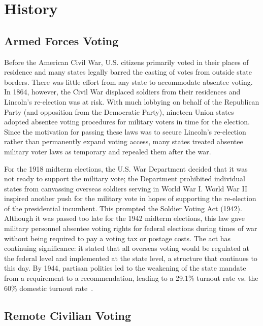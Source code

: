 \section{History}

\subsection{Armed Forces Voting}
Before the American Civil War, U.S. citizens primarily voted in their
places of residence and many states legally barred the casting of
votes from outside state borders. There was little effort from any
state to accommodate absentee voting. In 1864, however, the Civil War
displaced soldiers from their residences and Lincoln's re-election was
at risk. With much lobbying on behalf of the Republican Party (and
opposition from the Democratic Party), nineteen Union states adopted
absentee voting procedures for military voters in time for the
election. Since the motivation for passing these laws was to secure
Lincoln's re-election rather than permanently expand voting access,
many states treated absentee military voter laws as temporary and
repealed them after the war.

For the 1918 midterm elections, the U.S. War Department decided that
it was not ready to support the military vote; the Department
prohibited individual states from canvassing overseas soldiers serving
in World War I. World War II inspired another push for the military
vote in hopes of supporting the re-election of the presidential
incumbent. This prompted the Soldier Voting Act (1942).  Although it
was passed too late for the 1942 midterm elections, this law gave
military personnel absentee voting rights for federal elections during
times of war without being required to pay a voting tax or postage
costs. The act has continuing significance: it stated that all
overseas voting would be regulated at the federal level and
implemented at the state level, a structure that continues to this
day. By 1944, partisan politics led to the weakening of the state
mandate from a requirement to a recommendation, leading to a 29.1\%
turnout rate vs. the 60\% domestic turnout rate~\cite{smith2015}.

\subsection{Remote Civilian Voting}

